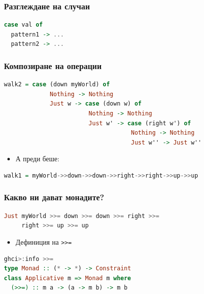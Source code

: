 \documentclass{beamer}
\begin{document}
\begin{frame}[fragile]
  \frametitle{Разглеждане на случаи}

\begin{lstlisting}[basicstyle=\small,language=Haskell]
case val of
  pattern1 -> ...
  pattern2 -> ...
\end{lstlisting}

\end{frame}



\begin{frame}[fragile]
  \frametitle{Композиране на операции}

\begin{lstlisting}[basicstyle=\small,language=Haskell]
walk2 = case (down myWorld) of
             Nothing -> Nothing
             Just w -> case (down w) of
                        Nothing -> Nothing
                        Just w' -> case (right w') of
                                    Nothing -> Nothing
                                    Just w'' -> Just w''

\end{lstlisting}

\begin{itemize}
  \item А преди беше:
\end{itemize}

\begin{lstlisting}[basicstyle=\small,language=Haskell]
walk1 = myWorld->>down->>down->>right->>right->>up->>up
\end{lstlisting}


\end{frame}


\begin{frame}[fragile]
  \frametitle{Какво ни дават монадите?}

\begin{lstlisting}[basicstyle=\small,language=Haskell]
Just myWorld >>= down >>= down >>= right >>= 
     right >>= up >>= up
\end{lstlisting}

\begin{itemize}
  \item Дефиниция на \verb#>>=#
\end{itemize}

\begin{lstlisting}[basicstyle=\small,language=Haskell]
ghci>:info >>=
type Monad :: (* -> *) -> Constraint
class Applicative m => Monad m where
  (>>=) :: m a -> (a -> m b) -> m b
\end{lstlisting}
\end{frame}
\end{document}
